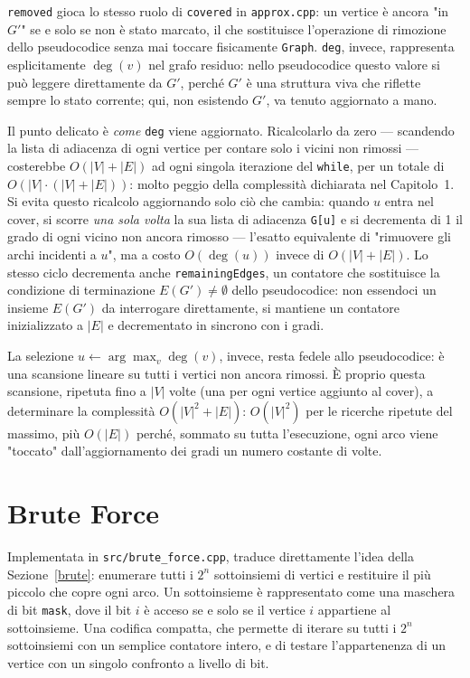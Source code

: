 \texttt{removed} gioca lo stesso ruolo di \texttt{covered} in \texttt{approx.cpp}: un vertice è ancora "in $G'$" se e solo se non è stato marcato, il che sostituisce l'operazione di rimozione dello pseudocodice senza mai toccare fisicamente \texttt{Graph}. \texttt{deg}, invece, rappresenta esplicitamente $\deg(v)$ nel grafo residuo: nello pseudocodice questo valore si può leggere direttamente da $G'$, perché $G'$ è una struttura viva che riflette sempre lo stato corrente; qui, non esistendo $G'$, va tenuto aggiornato a mano.

Il punto delicato è \emph{come} \texttt{deg} viene aggiornato. Ricalcolarlo da zero — scandendo la lista di adiacenza di ogni vertice per contare solo i vicini non rimossi — costerebbe $O(|V|+|E|)$ ad ogni singola iterazione del \texttt{while}, per un totale di $O(|V|\cdot(|V|+|E|))$: molto peggio della complessità dichiarata nel Capitolo~1. Si evita questo ricalcolo aggiornando solo ciò che cambia: quando $u$ entra nel cover, si scorre \emph{una sola volta} la sua lista di adiacenza \texttt{G[u]} e si decrementa di 1 il grado di ogni vicino non ancora rimosso — l'esatto equivalente di "rimuovere gli archi incidenti a $u$", ma a costo $O(\deg(u))$ invece di $O(|V|+|E|)$. Lo stesso ciclo decrementa anche \texttt{remainingEdges}, un contatore che sostituisce la condizione di terminazione $E(G') \neq \emptyset$ dello pseudocodice: non essendoci un insieme $E(G')$ da interrogare direttamente, si mantiene un contatore inizializzato a $|E|$ e decrementato in sincrono con i gradi.

La selezione $u \gets \arg\max_{v} \deg(v)$, invece, resta fedele allo pseudocodice: è una scansione lineare su tutti i vertici non ancora rimossi. È proprio questa scansione, ripetuta fino a $|V|$ volte (una per ogni vertice aggiunto al cover), a determinare la complessità $O(|V|^2+|E|)$: $O(|V|^2)$ per le ricerche ripetute del massimo, più $O(|E|)$ perché, sommato su tutta l'esecuzione, ogni arco viene "toccato" dall'aggiornamento dei gradi un numero costante di volte.

\section{Brute Force}

Implementata in \texttt{src/brute\_force.cpp}, traduce direttamente l'idea della Sezione~\ref{brute}: 
enumerare tutti i $2^n$ sottoinsiemi di vertici e restituire il più piccolo che copre ogni arco. 
Un sottoinsieme è rappresentato come una maschera di bit \texttt{mask}, 
dove il bit $i$ è acceso se e solo se il vertice $i$ appartiene al sottoinsieme.
Una codifica compatta, che permette di iterare su tutti i $2^n$ sottoinsiemi con un semplice contatore intero, 
 e di testare l'appartenenza di un vertice con un singolo confronto a livello di bit.

